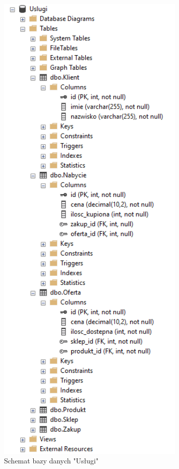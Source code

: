 \documentclass[a4paper,12pt]{article}
\begin{document}
\begin{figure}[H]
\centering
\includegraphics[width=0.8\textwidth]{images/uslugi_db.png}
\caption{Schemat bazy danych "Usługi"}
\label{fig:uslugi_db}
\end{figure}
\end{document}
